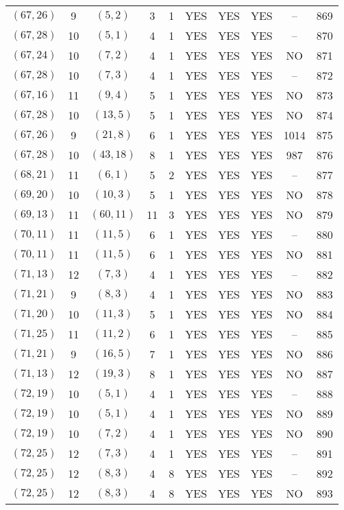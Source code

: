 \begin{longtable}{|c|c|c|c|c|c|c|c|c|c|}
$(67, 26)$ & 9 & $(5, 2)$ & 3 & 1 & YES & YES & YES & -- & 869\\
$(67, 28)$ & 10 & $(5, 1)$ & 4 & 1 & YES & YES & YES & -- & 870\\
$(67, 24)$ & 10 & $(7, 2)$ & 4 & 1 & YES & YES & YES & NO & 871\\
$(67, 28)$ & 10 & $(7, 3)$ & 4 & 1 & YES & YES & YES & -- & 872\\
$(67, 16)$ & 11 & $(9, 4)$ & 5 & 1 & YES & YES & YES & NO & 873\\
$(67, 28)$ & 10 & $(13, 5)$ & 5 & 1 & YES & YES & YES & NO & 874\\
$(67, 26)$ & 9 & $(21, 8)$ & 6 & 1 & YES & YES & YES & 1014 & 875\\
$(67, 28)$ & 10 & $(43, 18)$ & 8 & 1 & YES & YES & YES & 987 & 876\\
$(68, 21)$ & 11 & $(6, 1)$ & 5 & 2 & YES & YES & YES & -- & 877\\
$(69, 20)$ & 10 & $(10, 3)$ & 5 & 1 & YES & YES & YES & NO & 878\\
$(69, 13)$ & 11 & $(60, 11)$ & 11 & 3 & YES & YES & YES & NO & 879\\
$(70, 11)$ & 11 & $(11, 5)$ & 6 & 1 & YES & YES & YES & -- & 880\\
$(70, 11)$ & 11 & $(11, 5)$ & 6 & 1 & YES & YES & YES & NO & 881\\
$(71, 13)$ & 12 & $(7, 3)$ & 4 & 1 & YES & YES & YES & -- & 882\\
$(71, 21)$ & 9 & $(8, 3)$ & 4 & 1 & YES & YES & YES & NO & 883\\
$(71, 20)$ & 10 & $(11, 3)$ & 5 & 1 & YES & YES & YES & NO & 884\\
$(71, 25)$ & 11 & $(11, 2)$ & 6 & 1 & YES & YES & YES & -- & 885\\
$(71, 21)$ & 9 & $(16, 5)$ & 7 & 1 & YES & YES & YES & NO & 886\\
$(71, 13)$ & 12 & $(19, 3)$ & 8 & 1 & YES & YES & YES & NO & 887\\
$(72, 19)$ & 10 & $(5, 1)$ & 4 & 1 & YES & YES & YES & -- & 888\\
$(72, 19)$ & 10 & $(5, 1)$ & 4 & 1 & YES & YES & YES & NO & 889\\
$(72, 19)$ & 10 & $(7, 2)$ & 4 & 1 & YES & YES & YES & NO & 890\\
$(72, 25)$ & 12 & $(7, 3)$ & 4 & 1 & YES & YES & YES & -- & 891\\
$(72, 25)$ & 12 & $(8, 3)$ & 4 & 8 & YES & YES & YES & -- & 892\\
$(72, 25)$ & 12 & $(8, 3)$ & 4 & 8 & YES & YES & YES & NO & 893\\

\end{longtable}
